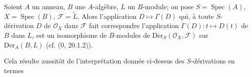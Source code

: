 \begin{proposition}[16.5.2]
\label{IV.16.5.2}
Soient $A$ un anneau, $B$ une $A$-algèbre, $L$ un $B$-module; on pose
$S=\operatorname{Spec}(A)$, $X=\operatorname{Spec}(B)$,
$\mathscr{F}=\widetilde{L}$. Alors l'application $D\mapsto\Gamma(D)$ qui, à
toute $S$-dérivation $D$ de $\mathcal{O}_X$ dans $\mathscr{F}$ fait
correspondre l'application $\Gamma(D):t\mapsto D(t)$ de $B$ dans $L$, est un
isomorphisme de $B$-modules de
$\operatorname{D\acute{e}r}_S(\mathcal{O}_X,\mathscr{F})$ sur
$\operatorname{D\acute{e}r}_A(B,L)$ (cf. (0, 20.1.2)).
\end{proposition}

Cela résulte aussitôt de l'interprétation donnée ci-dessus des $S$-dérivations
en termes
